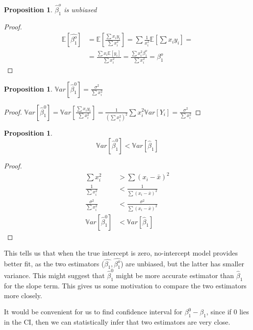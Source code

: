 \documentclass[12pt,a4paper,oneside]{book} %
\newtheorem{proposition}[theorem]{Proposition}
\begin{document}
	\begin{proposition}
		$\hat{\beta}_1^o$ is unbiased
	\end{proposition}
	\begin{proof}
		\begin{align*}
			\mathbb{E} [\hat{\beta_1^o}] &= \mathbb{E} [\frac{\sum x_i y_i}{\sum x_i^2}] = \sum \frac{1}{x_i^2} \mathbb{E}[\sum x_i y_i] = \\
			&= \frac{\sum x_i\mathbb{E}[y_i]}{\sum x_i^2} = \frac{\sum x_i^2 \beta_1^o}{\sum x_i^2} = \beta_1^o 
		\end{align*}
	\end{proof}
	\begin{proposition} \label{prop:variance_slop_no_intercept}	$\mathbb{V}ar[\hat{\beta}_1^0] = \frac{\sigma^2}{\sum x_i^2}$
	\end{proposition}
	\begin{proof}	$
		\mathbb{V}ar[\hat{\beta}_1^0] =  \mathbb{V}ar[\frac{\sum x_i y_i}{\sum x_i^2}] = \frac{1}{(\sum x_i^2)^2} \sum x_i^2 \mathbb{V}ar[Y_i] = \frac{\sigma^2}{\sum x_i^2}
		$
	\end{proof}


	\begin{proposition} \label{prop:variance_no_intercept_is_lower}
		\[
			\mathbb{V}ar[\hat{\beta}_1^0] < \mathbb{V}ar[\hat{\beta}_1]
		\]
	\end{proposition}

	\begin{proof}
		\begin{align*}
			\sum x_i^2 &> \sum (x_i - \bar{x})^2  \\
			\frac{1}{\sum x_i^2}  &< \frac{1}{\sum (x_i - \bar{x})^2}  \\
			\frac{\sigma^2}{\sum x_i^2}  &< \frac{\sigma^2}{\sum (x_i - \bar{x})^2}  \\
			\mathbb{V}ar[\hat{\beta}_1^0] &< \mathbb{V}ar[\hat{\beta}_1] 
		\end{align*}
	\end{proof}

This tells us that when the true intercept is zero, no-intercept model provides better fit, as the two estimators ($\hat{\beta_1}, \hat{\beta_1^o}$) are unbiased, but the latter has smaller variance. 
This might suggest that $\hat{\beta}_1^0$ might be more accurate estimator than $\hat{\beta}_1$ for the slope term. This gives us some motivation to compare the two estimators more closely.

It would be convenient for us to find confidence interval for $\beta_1^0 - \beta_1$, since if 0 lies in the CI, then we can statistically infer that two estimators are very close.
\end{document}
